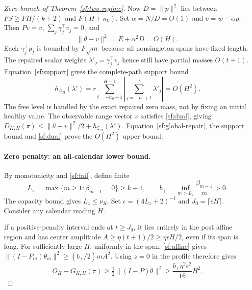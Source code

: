 \begin{proof}[Zero branch of Theorem~\ref{sf:two-regime}]
Now $D=\|p\|^2$ lies between $FS\ge FH/(k+2)$ and $F(H+n_0)$.
Set $\alpha=N/D=O(1)$ and $v=w-\alpha p$.
Then $Pv=v$, $\sum_j\gamma_j^\top v_j=0$, and
\begin{equation}\label{sf:global-repair}
\|\theta-v\|^2=E+\alpha^2D=O(H).
\end{equation}
Each $\gamma_j^\top p_j$ is bounded by $F\sqrt m$ because
all nonsingleton spans have fixed length. The repaired scalar weights
$\lambda'_j=\gamma_j^\top v_j$ hence still have partial masses $O(t+1)$.
Equation~\eqref{sf:support} gives the complete-path support bound
\begin{equation}\label{sf:zero-support}
h_{\mathcal Z_H}(\lambda')=
r\sum_{t=-n_0+1}^{H-1}
 \left|\sum_{j=-n_0+1}^t\lambda'_j\right|=O(H^2).
\end{equation}
The free level is handled by the exact repaired zero mass, not by fixing
an initial healthy value.
The observable range vector $v$ satisfies \eqref{sf:dual}, giving
$D_{K,H}(\pi)\le\|\theta-v\|^2/2+h_{\mathcal Z_H}(\lambda')$.
Equation~\eqref{sf:global-repair}, the support bound and \eqref{sf:dual}
prove the $O(H^2)$ upper bound.

\paragraph{Zero penalty: an all-calendar lower bound.}
By monotonicity and \eqref{sf:tail}, define finite
\[
L_z=\max\{m\ge1:\beta_{m-1}=0\}\ge k+1,\qquad
b_+=\inf_{m>L_z}\frac{\beta_{m-1}}m>0 .
\]
The capacity bound gives $L_z\le\nu_R$.
Set $\epsilon=(4L_z+2)^{-1}$ and $J_0=\lceil\epsilon H\rceil$.
Consider any calendar reading $H$.

If a positive-penalty interval ends at $t\ge J_0$, it lies entirely
in the post affine region and has center amplitude
$A\ge\eta(t+1)/2\ge\eta\epsilon H/2$, even if its span is long.
For sufficiently large $H$, uniformly in the span,
\eqref{sf:affine} gives
$\|(I-P_m)\theta_m\|^2\ge(b_+/2)mA^2$.
Using $z=0$ in the profile therefore gives
\begin{equation}\label{sf:zero-positive-case}
O_H-G_{K,H}(\pi)\ge\tfrac12\|(I-P)\theta\|^2
\ge \frac{b_+\eta^2\epsilon^2}{16}H^2 .
\end{equation}


\end{proof}
